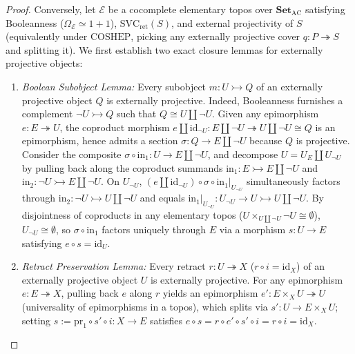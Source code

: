 \begin{proof}
Conversely, let $\mathcal{E}$ be a cocomplete elementary topos over $\mathbf{Set}_{\mathrm{AC}}$ satisfying Booleanness ($\Omega_{\mathcal{E}} \simeq 1+1$), $\mathrm{SVC}_{\mathrm{ret}}(S)$, and external projectivity of $S$ (equivalently under $\mathrm{COSHEP}$, picking any externally projective cover $q : P \twoheadrightarrow S$ and splitting it). We first establish two exact closure lemmas for externally projective objects:
\begin{enumerate}
  \item \emph{Boolean Subobject Lemma:} Every subobject $m : U \rightarrowtail Q$ of an externally projective object $Q$ is externally projective. Indeed, Booleanness furnishes a complement $\neg U \rightarrowtail Q$ such that $Q \cong U \amalg \neg U$. Given any epimorphism $e : E \twoheadrightarrow U$, the coproduct morphism $e \amalg \mathrm{id}_{\neg U} : E \amalg \neg U \twoheadrightarrow U \amalg \neg U \cong Q$ is an epimorphism, hence admits a section $\sigma : Q \to E \amalg \neg U$ because $Q$ is projective. Consider the composite $\sigma \circ \mathrm{in}_1 : U \to E \amalg \neg U$, and decompose $U = U_E \amalg U_{\neg U}$ by pulling back along the coproduct summands $\mathrm{in}_1 : E \rightarrowtail E \amalg \neg U$ and $\mathrm{in}_2 : \neg U \rightarrowtail E \amalg \neg U$. On $U_{\neg U}$, $(e \amalg \mathrm{id}_{\neg U}) \circ \sigma \circ \mathrm{in}_1|_{U_{\neg U}}$ simultaneously factors through $\mathrm{in}_2 : \neg U \rightarrowtail U \amalg \neg U$ and equals $\mathrm{in}_1|_{U_{\neg U}} : U_{\neg U} \to U \rightarrowtail U \amalg \neg U$. By disjointness of coproducts in any elementary topos ($U \times_{U \amalg \neg U} \neg U \cong \emptyset$), $U_{\neg U} \cong \emptyset$, so $\sigma \circ \mathrm{in}_1$ factors uniquely through $E$ via a morphism $s : U \to E$ satisfying $e \circ s = \mathrm{id}_U$.
  \item \emph{Retract Preservation Lemma:} Every retract $r : U \twoheadrightarrow X$ ($r \circ i = \mathrm{id}_X$) of an externally projective object $U$ is externally projective. For any epimorphism $e : E \twoheadrightarrow X$, pulling back $e$ along $r$ yields an epimorphism $e' : E \times_X U \twoheadrightarrow U$ (universality of epimorphisms in a topos), which splits via $s' : U \to E \times_X U$; setting $s := \mathrm{pr}_1 \circ s' \circ i : X \to E$ satisfies $e \circ s = r \circ e' \circ s' \circ i = r \circ i = \mathrm{id}_X$.
\end{enumerate}

\end{proof}
